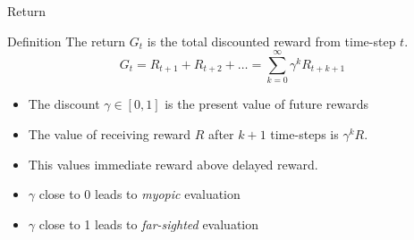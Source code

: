 \bgroup
\begin{frame}{Return}
\begin{block}{Definition}
The return $G_t$ is the total discounted reward from time-step $t$.
\begin{equation*}
G_t = R_{t+1} + R_{t+2} + \ldots = \sum_{k=0}^{\infty} \gamma^{k}R_{t+k+1}
\end{equation*}
\end{block}
\begin{itemize}
\item The discount $\gamma \in [0, 1]$ is the present value of future rewards
\item The value of receiving reward $R$ after $k + 1$ time-steps is $\gamma^{k} R$.
\item This values immediate reward above delayed reward.
\item $\gamma$ close to 0 leads to \emph{myopic} evaluation
\item $\gamma$ close to 1 leads to \emph{far-sighted} evaluation
\end{itemize}
\end{frame}
\egroup